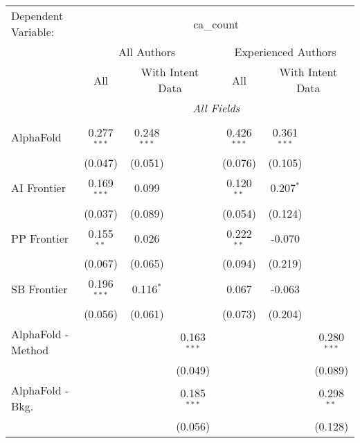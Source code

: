 \begingroup
\centering
\begin{tabular}{lcccccc}
   \tabularnewline \midrule \midrule
   Dependent Variable: & \multicolumn{6}{c}{ca\_count}\\
 & \multicolumn{3}{c}{All Authors} & \multicolumn{3}{c}{Experienced Authors} \\
\cmidrule(lr){2-4} \cmidrule(lr){5-7}
 & \multicolumn{1}{c}{All} & \multicolumn{2}{c}{With Intent Data} & \multicolumn{1}{c}{All} & \multicolumn{2}{c}{With Intent Data} \\
\cmidrule(lr){2-2} \cmidrule(lr){3-4} \cmidrule(lr){5-5} \cmidrule(lr){6-7}
 & \multicolumn{6}{c}{\textit{All Fields}} \\ \\
   AlphaFold            & 0.277$^{***}$ & 0.248$^{***}$ &                & 0.426$^{***}$ & 0.361$^{***}$ &   \\   
                        & (0.047)       & (0.051)       &                & (0.076)       & (0.105)       &   \\   
   AI Frontier          & 0.169$^{***}$ & 0.099         &                & 0.120$^{**}$  & 0.207$^{*}$   &   \\   
                        & (0.037)       & (0.089)       &                & (0.054)       & (0.124)       &   \\   
   PP Frontier          & 0.155$^{**}$  & 0.026         &                & 0.222$^{**}$  & -0.070        &   \\   
                        & (0.067)       & (0.065)       &                & (0.094)       & (0.219)       &   \\   
   SB Frontier          & 0.196$^{***}$ & 0.116$^{*}$   &                & 0.067         & -0.063        &   \\   
                        & (0.056)       & (0.061)       &                & (0.073)       & (0.204)       &   \\   
   AlphaFold - Method   &               &               & 0.163$^{***}$  &               &               & 0.280$^{***}$\\   
                        &               &               & (0.049)        &               &               & (0.089)\\   
   AlphaFold - Bkg.     &               &               & 0.185$^{***}$  &               &               & 0.298$^{**}$\\   
                        &               &               & (0.056)        &               &               & (0.128)\\   

\end{tabular}
